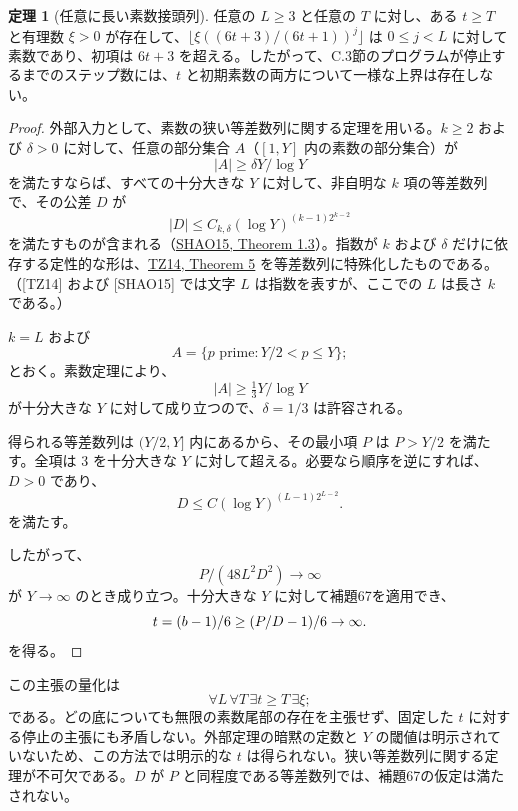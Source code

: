 \documentclass[11pt,reqno]{amsart}
\theoremstyle{definition}
\newtheorem{theorem}{定理}
\theoremstyle{definition}
\theoremstyle{remark}
\begin{document}
\begin{samepage}
\begin{theorem}[任意に長い素数接頭列]\leavevmode\label{thm:68}
任意の \(L\ge3\) と任意の \(T\) に対し、ある \(t\ge T\) と有理数 \(\xi>0\) が存在して、\(\lfloor\xi((6t+3)/(6t+1))^j\rfloor\) は \(0\le j<L\) に対して素数であり、初項は \(6t+3\) を超える。したがって、C.3節のプログラムが停止するまでのステップ数には、\(t\) と初期素数の両方について一様な上界は存在しない。
\label{thm-end:68}
\end{theorem}
\end{samepage}

\begin{proof}\leavevmode\label{proof:68}
外部入力として、素数の狭い等差数列に関する定理を用いる。\(k\ge2\) および \(\delta>0\) に対して、任意の部分集合 \(A\)（\([1,Y]\) 内の素数の部分集合）が
\[
|A|\ge\delta Y/\log Y
\]
を満たすならば、すべての十分大きな \(Y\) に対して、非自明な \(k\) 項の等差数列で、その公差 \(D\) が
\[
|D|\le C_{k,\delta}(\log Y)^{(k-1)2^{k-2}}
\]
を満たすものが含まれる（\hyperref[ref-shao15]{SHAO15, Theorem 1.3}）。指数が \(k\) および \(\delta\) だけに依存する定性的な形は、\hyperref[ref-tz14]{TZ14, Theorem 5} を等差数列に特殊化したものである。（{[}TZ14{]} および {[}SHAO15{]} では文字 \(L\) は指数を表すが、ここでの \(L\) は長さ \(k\) である。）

\(k=L\) および
\[
A=\{p\text{ prime}:Y/2<p\le Y\};
\]
とおく。素数定理により、
\[
|A|\ge\tfrac13Y/\log Y
\]
が十分大きな \(Y\) に対して成り立つので、\(\delta=1/3\) は許容される。

得られる等差数列は \((Y/2,Y]\) 内にあるから、その最小項 \(P\) は \(P>Y/2\) を満たす。全項は \(3\) を十分大きな \(Y\) に対して超える。必要なら順序を逆にすれば、\(D>0\) であり、
\[
D\le C(\log Y)^{(L-1)2^{L-2}}.
\]
を満たす。

したがって、
\[
P/(48L^2D^2)\to\infty
\]
が \(Y\to\infty\) のとき成り立つ。十分大きな \(Y\) に対して補題67を適用でき、
\[
t=(b-1)/6\ge(P/D-1)/6\to\infty.\qedhere
\]
を得る。
\end{proof}

この主張の量化は
\[
\forall L\,\forall T\,\exists t\ge T\,\exists\xi;
\]
である。どの底についても無限の素数尾部の存在を主張せず、固定した \(t\) に対する停止の主張にも矛盾しない。外部定理の暗黙の定数と \(Y\) の閾値は明示されていないため、この方法では明示的な \(t\) は得られない。狭い等差数列に関する定理が不可欠である。\(D\) が \(P\) と同程度である等差数列では、補題67の仮定は満たされない。
\end{document}
